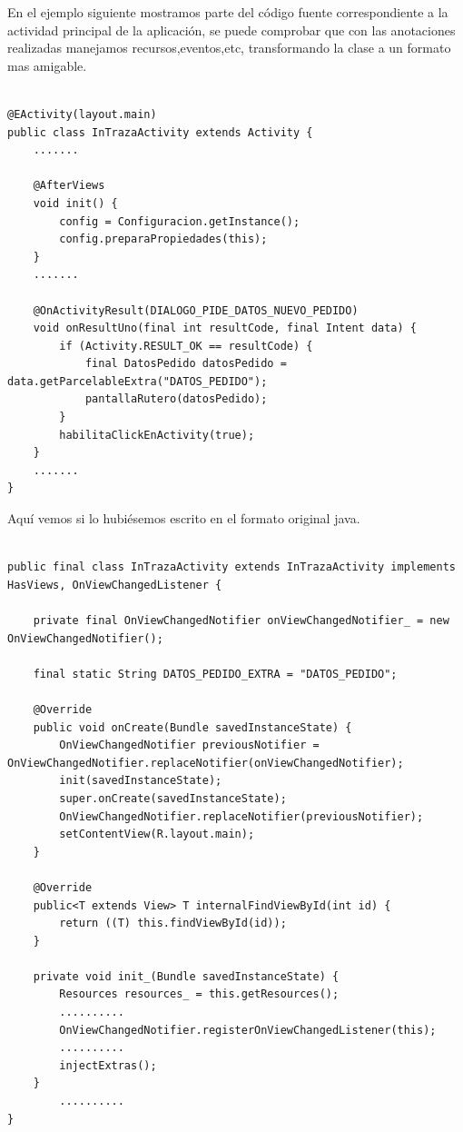 En el ejemplo siguiente mostramos parte del código fuente correspondiente a la actividad principal de la aplicación, se puede comprobar que con las anotaciones realizadas manejamos recursos,eventos,etc, transformando la clase a un formato mas amigable.

\pagebreak

\begin{lstlisting}[style=JAVA]

@EActivity(layout.main)
public class InTrazaActivity extends Activity {
	.......	

	@AfterViews
	void init() {
		config = Configuracion.getInstance();
		config.preparaPropiedades(this);
	}	
	.......	
	
	@OnActivityResult(DIALOGO_PIDE_DATOS_NUEVO_PEDIDO)
	void onResultUno(final int resultCode, final Intent data) {
		if (Activity.RESULT_OK == resultCode) {
			final DatosPedido datosPedido = data.getParcelableExtra("DATOS_PEDIDO");
			pantallaRutero(datosPedido);
		}
		habilitaClickEnActivity(true);
	}
	.......		
}
\end{lstlisting}

Aquí vemos si lo hubiésemos escrito en el formato original java.\\


\begin{lstlisting}[style=JAVA]

public final class InTrazaActivity extends InTrazaActivity implements HasViews, OnViewChangedListener {

	private final OnViewChangedNotifier onViewChangedNotifier_ = new OnViewChangedNotifier();

	final static String DATOS_PEDIDO_EXTRA = "DATOS_PEDIDO";

	@Override
	public void onCreate(Bundle savedInstanceState) {
		OnViewChangedNotifier previousNotifier = OnViewChangedNotifier.replaceNotifier(onViewChangedNotifier);
		init(savedInstanceState);
		super.onCreate(savedInstanceState);
		OnViewChangedNotifier.replaceNotifier(previousNotifier);
		setContentView(R.layout.main);
	}

	@Override
	public<T extends View> T internalFindViewById(int id) {
		return ((T) this.findViewById(id));
	}

	private void init_(Bundle savedInstanceState) {
		Resources resources_ = this.getResources();
		..........
		OnViewChangedNotifier.registerOnViewChangedListener(this);
		..........
		injectExtras();
	}
		..........
}
\end{lstlisting}



